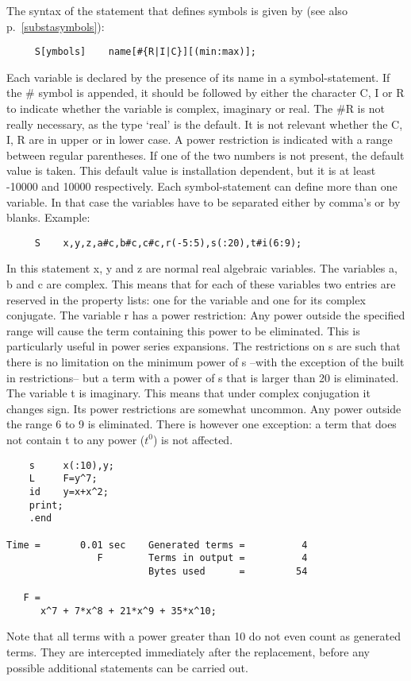 The syntax of the statement that defines symbols is given by (see also 
p.~\ref{substasymbols}): 
\begin{verbatim}
     S[ymbols]    name[#{R|I|C}][(min:max)];
\end{verbatim}
Each variable is declared by the presence of its name in a 
symbol-statement. If the \# symbol is appended, it should be followed by 
either the character C, I or R to indicate whether the variable is 
complex, imaginary or real. The 
\#R is not really necessary, as the type `real' is the default. It is not 
relevant whether the C, I, R are in upper or in lower case. A power 
restriction is indicated with a range between 
regular parentheses. If one of the two numbers is not present, the default 
value is taken. This default value is installation dependent, but it is at 
least -10000 and 10000 respectively. Each symbol-statement can define more 
than one variable. In that case the variables have to be separated either 
by comma's or by blanks. Example:
\begin{verbatim}
     S    x,y,z,a#c,b#c,c#c,r(-5:5),s(:20),t#i(6:9);
\end{verbatim}
In this statement x, y and z are normal real algebraic variables. The 
variables a, b and c are complex. This means that for each of these 
variables two entries are reserved in the property lists: one for the 
variable and one for its complex conjugate. The variable r has a power 
restriction: Any power outside the specified range will cause the term 
containing this power to be eliminated. This is particularly useful in 
power series expansions. The restrictions on s are such that there is 
no limitation on the minimum power of s --with the exception of the 
built in restrictions-- but a term with a power of s that is larger 
than 20 is eliminated. The variable t is imaginary. This means that 
under complex conjugation it changes sign. Its power restrictions are 
somewhat uncommon. Any power outside the range 6 to 9 is eliminated. 
There is however one exception: a term that does not contain t to any 
power ($t^0$) is not affected. 
\begin{verbatim}
    s     x(:10),y;
    L     F=y^7;
    id    y=x+x^2;
    print;
    .end

Time =       0.01 sec    Generated terms =          4
                F        Terms in output =          4
                         Bytes used      =         54

   F =
      x^7 + 7*x^8 + 21*x^9 + 35*x^10;
\end{verbatim}
Note that all terms with a power greater than 10 do not even count 
as generated terms. They are intercepted immediately after the 
replacement, before any possible additional statements can be 
carried out.

